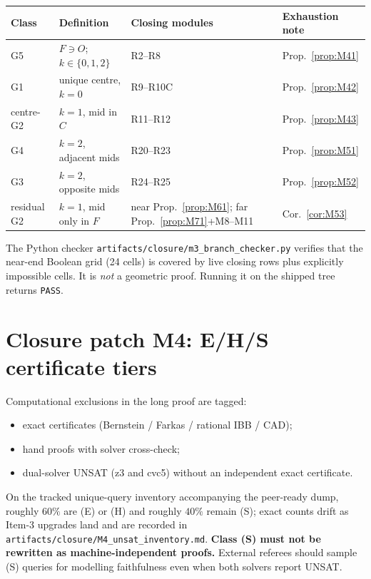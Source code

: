 \documentclass[11pt,reqno]{amsart}
\theoremstyle{definition}
\begin{document}
\begin{center}
\small
\begin{tabular}{@{}llll@{}}
\toprule
Class & Definition & Closing modules & Exhaustion note \\
\midrule
G5 & $F\ni O$; $k\in\{0,1,2\}$ & R2--R8 & Prop.~\ref{prop:M41} \\
G1 & unique centre, $k=0$ & R9--R10C & Prop.~\ref{prop:M42} \\
centre-G2 & $k=1$, mid in $C$ & R11--R12 & Prop.~\ref{prop:M43} \\
G4 & $k=2$, adjacent mids & R20--R23 & Prop.~\ref{prop:M51} \\
G3 & $k=2$, opposite mids & R24--R25 & Prop.~\ref{prop:M52} \\
residual G2 & $k=1$, mid only in $F$ & near Prop.~\ref{prop:M61}; far Prop.~\ref{prop:M71}+M8--M11 & Cor.~\ref{cor:M53} \\
\bottomrule
\end{tabular}
\end{center}

\noindent
The Python checker \texttt{artifacts/closure/m3\_branch\_checker.py} verifies
that the near-end Boolean grid (24 cells) is covered by live closing rows
plus explicitly impossible cells.  It is \emph{not} a geometric proof.
Running it on the shipped tree returns \texttt{PASS}.

\section{Closure patch M4: E/H/S certificate tiers}\label{app:M4}

Computational exclusions in the long proof are tagged:
\begin{itemize}[leftmargin=*]
\item[(E)] exact certificates (Bernstein / Farkas / rational IBB / CAD);
\item[(H)] hand proofs with solver cross-check;
\item[(S)] dual-solver UNSAT (z3 and cvc5) without an independent exact
certificate.
\end{itemize}
On the tracked unique-query inventory accompanying the peer-ready dump,
roughly $60\%$ are (E) or (H) and roughly $40\%$ remain (S); exact counts
drift as Item-3 upgrades land and are recorded in
\texttt{artifacts/closure/M4\_unsat\_inventory.md}.
\textbf{Class (S) must not be rewritten as machine-independent proofs.}
External referees should sample (S) queries for modelling faithfulness even
when both solvers report UNSAT.



\end{document}

